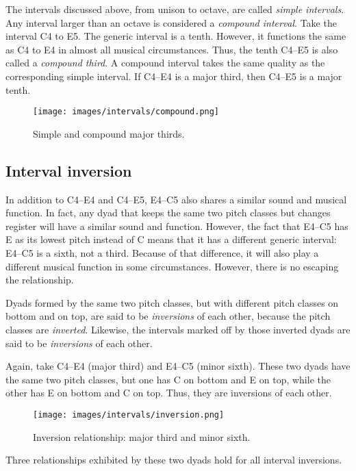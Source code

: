 \documentclass{book}
\begin{document}
The intervals discussed above, from unison to octave, are called \emph{simple
intervals}. Any interval larger than an octave is considered a \emph{compound
interval}. Take the interval C4 to E5. The generic interval is a tenth.
However, it functions the same as C4 to E4 in almost all musical
circumstances. Thus, the tenth C4--E5 is also called a \emph{compound third}.
A compound interval takes the same quality as the corresponding simple
interval. If C4--E4 is a major third, then C4--E5 is a major tenth.

\begin{figure}
\centering
\texttt{[image: images/intervals/compound.png]}
\caption{Simple and compound major thirds.}
\end{figure}

\hypertarget{interval-inversion}{%
\subsection{Interval inversion}\label{interval-inversion}}

In addition to C4--E4 and C4--E5, E4--C5 also shares a similar sound and
musical function. In fact, any dyad that keeps the same two pitch classes but
changes register will have a similar sound and function. However, the fact
that E4--C5 has E as its lowest pitch instead of C means that it has a
different generic interval: E4--C5 is a sixth, not a third. Because of that
difference, it will also play a different musical function in some
circumstances. However, there is no escaping the relationship.

Dyads formed by the same two pitch classes, but with different pitch classes
on bottom and on top, are said to be \emph{inversions} of each other, because
the pitch classes are \emph{inverted}. Likewise, the intervals marked off by
those inverted dyads are said to be \emph{inversions} of each other.

Again, take C4--E4 (major third) and E4--C5 (minor sixth). These two dyads
have the same two pitch classes, but one has C on bottom and E on top, while
the other has E on bottom and C on top. Thus, they are inversions of each
other.

\begin{figure}
\centering
\texttt{[image: images/intervals/inversion.png]}
\caption{Inversion relationship: major third and minor sixth.}
\end{figure}

Three relationships exhibited by these two dyads hold for all interval
inversions.
\end{document}
